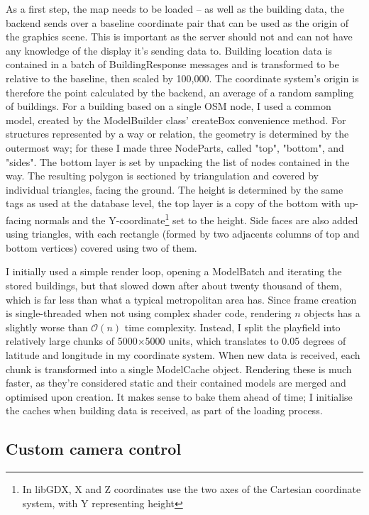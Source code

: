 As a first step, the map needs to be loaded -- as well as the building data, the backend sends over a baseline coordinate pair that can be used as the origin of the graphics scene. This is important as the server should not and can not have any knowledge of the display it's sending data to. Building location data is contained in a batch of BuildingResponse messages and is transformed to be relative to the baseline, then scaled by 100,000. The coordinate system's origin is therefore the point calculated by the backend, an average of a random sampling of buildings. For a building based on a single OSM node, I used a common model, created by the ModelBuilder class' createBox convenience method. For structures represented by a way or relation, the geometry is determined by the outermost way; for these I made three NodeParts, called "top", "bottom", and "sides". The bottom layer is set by unpacking the list of nodes contained in the way. The resulting polygon is sectioned by triangulation and covered by individual triangles, facing the ground. The height is determined by the same tags as used at the database level, the top layer is a copy of the bottom with up-facing normals and the Y-coordinate\footnote{In libGDX, X and Z coordinates use the two axes of the Cartesian coordinate system, with Y representing height} set to the height. Side faces are also added using triangles, with each rectangle (formed by two adjacents columns of top and bottom vertices) covered using two of them.

I initially used a simple render loop, opening a ModelBatch and iterating the stored buildings, but that slowed down after about twenty thousand of them, which is far less than what a typical metropolitan area has. Since frame creation is single-threaded when not using complex shader code, rendering $n$ objects has a slightly worse than $\mathcal{O}(n)$ time complexity. Instead, I split the playfield into relatively large chunks of 5000$\times$5000 units, which translates to 0.05 degrees of latitude and longitude in my coordinate system. When new data is received, each chunk is transformed into a single ModelCache object. Rendering these is much faster, as they're considered static and their contained models are merged and optimised upon creation.\cite{LibgdxModelCache} It makes sense to bake them ahead of time; I initialise the caches when building data is received, as part of the loading process.

\subsection{Custom camera control}

